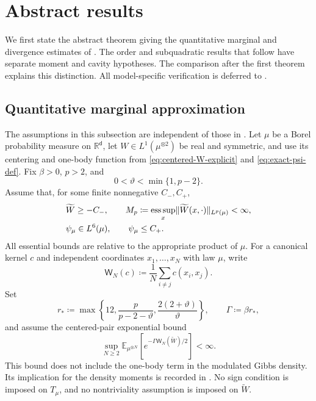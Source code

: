 \documentclass[11pt,reqno]{amsart}
\numberwithin{equation}{section}
\theoremstyle{plain}
\theoremstyle{remark}
\DeclarePairedDelimiter{\norm}{\lVert}{\rVert}
\renewcommand{\d}{\mathsf{d}}
\newcommand{\R}{{\mathbb{R}}}
\newcommand{\E}{{\mathbb{E}}}
\newcommand{\tl}{\widetilde}
\newcommand{\be}{\beta}
\begin{document}
\section{Abstract results}
\label{sec:analytic-hypotheses-constants}

We first state the abstract theorem giving the quantitative marginal and divergence estimates of .  The order and subquadratic results that follow have separate moment and cavity hypotheses.  The comparison after the first theorem explains this distinction.  All model-specific verification is deferred to .

\subsection{Quantitative marginal approximation}
\label{subsec:abstract-quantitative-marginal}

The assumptions in this subsection are independent of those in
.  Let $\mu$ be a Borel probability measure
on $\R^\d$, let $W\in L^1(\mu^{\otimes2})$ be real and symmetric, and use
its centering and one-body function from \eqref{eq:centered-W-explicit} and
\eqref{eq:exact-psi-def}.  Fix $\be>0$, $p>2$, and
\begin{equation}\label{eq:signed-vartheta}
 0<\vartheta<\min\{1,p-2\}.
\end{equation}
Assume that, for some finite nonnegative $C_-,C_+$,
\begin{align}
 &\tl W\geq-C_-,\qquad
 M_p\coloneqq\operatorname*{ess\,sup}_{x}
          \norm{\tl W(x,\cdot)}_{L^p(\mu)}<\infty,
 \label{eq:signed-kernel-assumptions}\\
 &\psi_\mu\in L^6(\mu),\qquad \psi_\mu\leq C_+.
 \label{eq:signed-source-assumptions}
\end{align}
All essential bounds are relative to the appropriate product of $\mu$.
For a canonical kernel $c$ and independent coordinates $x_1,\ldots,x_N$
with law $\mu$, write
\begin{equation}\label{eq:signed-ordered-statistic}
 \mathsf W_N(c)\coloneqq\frac1N\sum_{i\ne j}c(x_i,x_j).
\end{equation}
Set
\begin{equation}\label{eq:signed-temperature-amplification}
 r_*\coloneqq\max\left\{12,\frac{p}{p-2-\vartheta},
                         \frac{2(2+\vartheta)}{\vartheta}\right\},
 \qquad \Gamma\coloneqq\be r_*,
\end{equation}
and assume the centered-pair exponential bound
\begin{equation}\label{eq:signed-centered-pair-moment}
 \sup_{N\geq2}\E_{\mu^{\otimes N}}
       \left[e^{-\Gamma\mathsf W_N(\tl W)/2}\right]<\infty.
\end{equation}
This bound does not include the one-body term in the modulated Gibbs density.
Its implication for the density moments is recorded in
.  No sign condition is imposed on
$T_\mu$, and no nontriviality assumption is imposed on $\tl W$.
\end{document}
